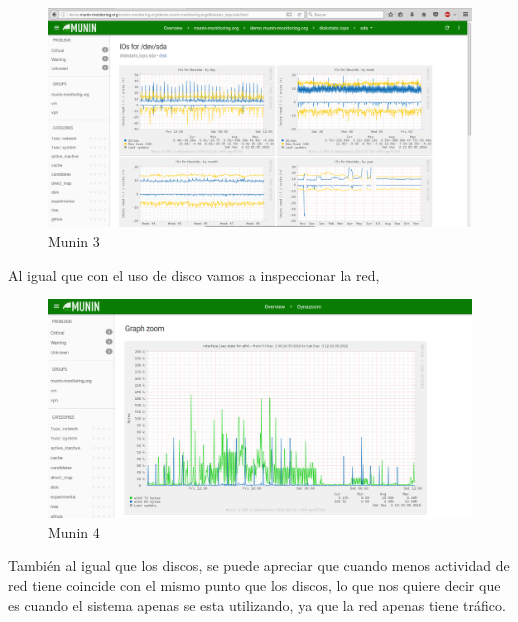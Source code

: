 \begin{figure}[H] %
	\centering
	\includegraphics[scale=0.35]{pics/munin3.png}  %
	\caption{Munin 3} \label{fig:munin3}
\end{figure}

Al igual que con el uso de disco vamos a inspeccionar la red,

\begin{figure}[H] %
	\centering
	\includegraphics[scale=0.35]{pics/munin4.png}  %
	\caption{Munin 4} \label{fig:munin4}
\end{figure}

También al igual que los discos, se puede apreciar que cuando menos actividad de red  tiene coincide con el mismo punto que los discos, lo que nos quiere decir que es cuando el sistema apenas se esta utilizando, ya que la red apenas tiene tráfico.

